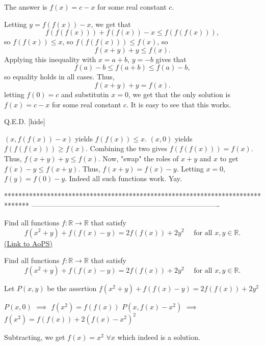 \begin{solution}
The answer is $f\left(x\right)=c-x$ for some real constant $c$.

Letting $y=f\left(f\left(x\right)\right)-x$, we get that \[f\left(f\left(f\left(x\right)\right)\right)+f\left(f\left(x\right)\right)-x\leq f\left(f\left(f\left(x\right)\right)\right),\] so $f\left(f\left(x\right)\right)\leq x$, so $f\left(f\left(f\left(x\right)\right)\right)\leq f\left(x\right)$, so \[f\left(x+y\right)+y\leq f\left(x\right).\] Applying this inequality with $x=a+b$, $y=-b$ gives that \[f\left(a\right)-b\leq f\left(a+b\right)\leq f\left(a\right)-b,\] so equality holds in all cases. Thus, \[f\left(x+y\right)+y=f\left(x\right).\] letting $f\left(0\right)=c$ and substitutin $x=0$, we get that the only solution is $f\left(x\right)=c-x$ for some real constant $c$. It is easy to see that this works.

Q.E.D.
[\/hide]
\end{solution}



\begin{solution}
	$(x, f(f(x))-x)$ yields $f(f(x)) \le x$. $(x, 0)$ yields $f(f(f(x))) \ge f(x)$. Combining the two gives $f(f(f(x))) = f(x)$. Thus, $f(x + y) + y \le f(x)$. Now, "swap" the roles of $x+y$ and $x$ to get $f(x) - y \le f(x + y)$. Thus, $f(x + y) = f(x) - y$. Letting $x = 0$, $f(y) = f(0) - y$. Indeed all such functions work. Yay. 
\end{solution}
*******************************************************************************
-------------------------------------------------------------------------------

\begin{problem}
	Find all functions $f : \mathbb{R} \to \mathbb{R}$ that satisfy
\[f(x^2 + y) + f(f(x) - y) = 2f(f(x)) + 2y^2\quad\text{ for all }x, y \in \mathbb{R}.\]
	\flushright \href{https://artofproblemsolving.com/community/c6h532134}{(Link to AoPS)}
\end{problem}



\begin{solution}
	\begin{tcolorbox}Find all functions $f : \mathbb{R} \to \mathbb{R}$ that satisfy
\[f(x^2 + y) + f(f(x) - y) = 2f(f(x)) + 2y^2\quad\text{ for all }x, y \in \mathbb{R}.\]\end{tcolorbox}
Let $P(x,y)$ be the assertion $f(x^2+y)+f(f(x)-y)=2f(f(x))+2y^2$

$P(x,0)$ $\implies$ $f(x^2)=f(f(x))$
$P(x,f(x)-x^2)$ $\implies$ $f(x^2)=f(f(x))+2(f(x)-x^2)^2$

Subtracting, we get $\boxed{f(x)=x^2}$ $\forall x$ which indeed is a solution.
\end{solution}



